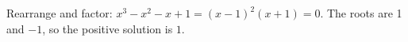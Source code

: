 Rearrange and factor: $ x^3-x^2-x+1=(x-1)^2(x+1)=0 $. The roots are 1 and $-1 $, so the positive solution is $\boxed1 $.
